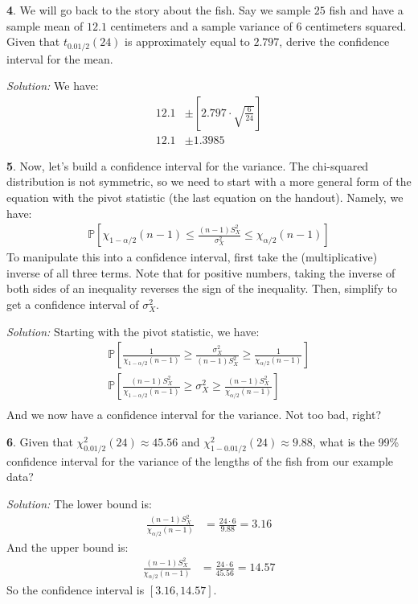 \documentclass{tufte-handout}
\begin{document}
\textbf{4}. We will go back to the story about the fish. Say we sample $25$ fish and
have a sample mean of $12.1$ centimeters and a sample variance of $6$
centimeters squared. Given that $t_{0.01/2}(24)$ is approximately equal
to $2.797$, derive the confidence interval for the mean.

\textit{Solution:} We have:
\begin{align*}
12.1 &\pm \left[ 2.797 \cdot \sqrt{\frac{6}{24}} \right] \\
12.1 &\pm 1.3985
\end{align*}

\textbf{5}. Now, let's build a confidence interval for the variance. The chi-squared 
distribution is not symmetric, so we need to start with a more general
form of the equation with the pivot statistic (the last equation on the
handout). Namely, we have:
\begin{align*}
\mathbb{P}\left[ \chi_{1 - \alpha/2}(n-1) \leq \frac{(n-1)S^2_X}{\sigma_X^2} \leq \chi_{\alpha/2}(n-1) \right]
\end{align*}
To manipulate this into a confidence interval, first take the (multiplicative)
inverse of all three terms. Note that for positive numbers, taking the inverse
of both sides of an inequality reverses the sign of the inequality. Then,
simplify to get a confidence interval of $\sigma_X^2$.

\textit{Solution:} Starting with the pivot statistic, we have:
\begin{align*}
\mathbb{P}\left[ \frac{1}{\chi_{1 - \alpha/2}(n-1)} \geq \frac{\sigma_X^2}{(n-1)S^2_X} \geq \frac{1}{\chi_{\alpha/2}(n-1)} \right] \\
\mathbb{P}\left[ \frac{(n-1)S^2_X}{\chi_{1 - \alpha/2}(n-1)} \geq \sigma_X^2 \geq \frac{(n-1)S^2_X}{\chi_{\alpha/2}(n-1)} \right] \\
\end{align*}
And we now have a confidence interval for the variance. Not too bad, right?

\textbf{6}. Given that $\chi^2_{0.01/2}(24) \approx 45.56$ and $\chi^2_{1-0.01/2}(24) \approx 9.88$,
what is the 99\% confidence interval for the variance of the lengths of the
fish from our example data?


\textit{Solution:} The lower bound is:
\begin{align*}
\frac{(n-1)S^2_X}{\chi_{\alpha/2}(n-1)} &= \frac{24 \cdot 6}{9.88} = 3.16
\end{align*}
And the upper bound is:
\begin{align*}
\frac{(n-1)S^2_X}{\chi_{\alpha/2}(n-1)} &= \frac{24 \cdot 6}{45.56} = 14.57
\end{align*}
So the confidence interval is $[3.16, 14.57]$.
\end{document}
